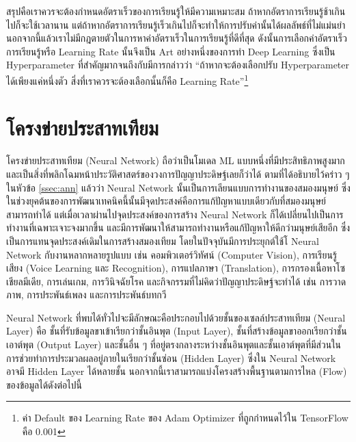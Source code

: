 สรุปคือเราควรจะต้องกำหนดอัตราเร็วของการเรียนรู้ให้มีความเหมาะสม ถ้าหากอัตราการเรียนรู้ช้าเกินไปก็จะใช้เวลานาน แต่ถ้าหากอัตราการเรียนรู้เร็วเกินไปก็จะทำให้การปรับค่านั้นได้ผลลัพธ์ที่ไม่แม่นยำ นอกจากนี้แล้วเราไม่มีกฎตายตัวในการหาค่าอัตราเร็วในการเรียนรู้ที่ดีที่สุด ดังนั้นการเลือกค่าอัตราเร็วการเรียนรู้หรือ Learning Rate นั้นจึงเป็น Art อย่างหนึ่งของการทำ Deep Learning ซึ่งเป็น Hyperparameter ที่สำคัญมากจนถึงกับมีการกล่าวว่า \enquote{ถ้าหากจะต้องเลือกปรับ Hyperparameter ได้เพียงแค่หนึ่งตัว สิ่งที่เราควรจะต้องเลือกนั้นก็คือ Learning Rate}\footnote{ค่า Default ของ Learning Rate ของ Adam Optimizer ที่ถูกกำหนดไว้ใน TensorFlow คือ 0.001}

\section{โครงข่ายประสาทเทียม}
\label{sec:nn}

โครงข่ายประสาทเทียม (Neural Network) ถือว่าเป็นโมเดล ML แบบหนึ่งที่มีประสิทธิภาพสูงมากและเป็นสิ่งที่พลิกโฉมหน้าประวัติศาสตร์ของวงการปัญญาประดิษฐ์เลยก็ว่าได้ ตามที่ได้อธิบายไว้คร่าว ๆ ในหัวข้อ \ref{ssec:ann} แล้วว่า Neural Network นั้นเป็นการเลียนแบบการทำงานของสมองมนุษย์ ซึ่งในช่วงยุคต้นของการพัฒนาเทคนิคนี้นั้นมีจุดประสงค์คือการแก้ปัญหาแบบเดียวกับที่สมองมนุษย์สามารถทำได้ แต่เมื่อเวลาผ่านไปจุดประสงค์ของการสร้าง Neural Network ก็ได้เปลี่ยนไปเป็นการทำงานที่เฉพาะเจาะจงมากขึ้น และมีการพัฒนาให้สามารถทำงานหรือแก้ปัญหาให้ดีกว่ามนุษย์เสียอีก ซึ่งเป็นการแทนจุดประสงค์เดิมในการสร้างสมองเทียม โดยในปัจจุบันมีการประยุกต์ใช้โ Neural Network กับงานหลากหลายรูปแบบ เช่น คอมพิวเตอร์วิทัศน์ (Computer Vision), การเรียนรู้เสียง (Voice Learning และ Recognition), การแปลภาษา (Translation), การกรองเนื้อหาโซเชียลมีเดีย, การเล่นเกม, การวินิจฉัยโรค และกิจกรรมที่ไม่คิดว่าปัญญาประดิษฐ์จะทำได้ เช่น การวาดภาพ, การประพันธ์เพลง และการประพันธ์บทกวี

Neural Network ที่พบได้ทั่วไปจะมีลักษณะคือประกอบไปด้วยชั้นของเซลล์ประสาทเทียม (Neural Layer) คือ ชั้นที่รับข้อมูลขาเข้าเรียกว่าชั้นอินพุต (Input Layer), ชั้นที่สร้างข้อมูลขาออกเรียกว่าชั้นเอาต์พุต (Output Layer) และชั้นอื่น ๆ ที่อยู่ตรงกลางระหว่างชั้นอินพุตและชั้นเอาต์พุตที่มีส่วนในการช่วยทำการประมวลผลอยู่ภายในเรียกว่าชั้นซ่อน (Hidden Layer) ซึ่งใน Neural Network อาจมี Hidden Layer ได้หลายชั้น นอกจากนี้เราสามารถแบ่งโครงสร้างพื้นฐานตามการไหล (Flow) ของข้อมูลได้ดังต่อไปนี้

